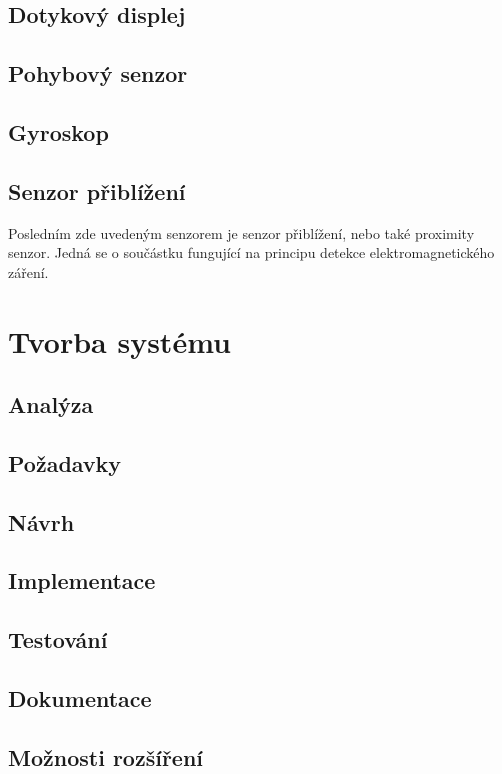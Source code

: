 \documentclass[thesis=B,czech,hidelinks]{FITthesis}[2012/06/26] %
\begin{document}
\section{Dotykový displej}
\label{section:touchscreen}

\section{Pohybový senzor}

\section{Gyroskop}

\section{Senzor přiblížení}

Posledním zde uvedeným senzorem je senzor přiblížení, nebo také proximity senzor. Jedná se o součástku fungující na principu detekce elektromagnetického záření. \cite{proximity}



\chapter{Tvorba systému}

\section{Analýza}
\section{Požadavky}
\section{Návrh}
\section{Implementace}
\section{Testování}
\section{Dokumentace}
\section{Možnosti rozšíření}
\end{document}
